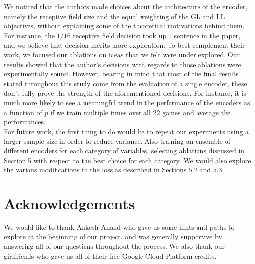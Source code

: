 We noticed that the authors made choices about the architecture of the encoder, namely the receptive field size and the equal weighting of the GL and LL objectives, without explaining some of the theoretical motivations behind them. For instance, the $1/16$ receptive field decision took up $1$ sentence in the paper, and we believe that decision merits more exploration. To best complement their work, we focused our ablations on ideas that we felt were under explored. Our results showed that the author's decisions with regards to those ablations were experimentally sound. However, bearing in mind that most of the final results stated throughout this study come from the evaluation of a single encoder, these don't fully prove the strength of the aforementioned decisions. For instance, it is much more likely to see a meaningful trend in the performance of the encoders as a function of $p$ if we train multiple times over all $22$ games and average the performances. \\

For future work, the first thing to do would be to repeat our experiments using a larger sample size in order to reduce variance. Also training an ensemble of different encoders for each category of variables, selecting ablations discussed in Section 5 with respect to the best choice for each category. We would also explore the various modifications to the loss as described in Sections 5.2 and 5.3.

\section{Acknowledgements}
We would like to thank Ankesh Anand who gave us some hints and paths to explore at the beginning of our project, and was generally supportive by answering all of our questions throughout the process. We also thank our girlfriends who gave us all of their free Google Cloud Platform credits.
